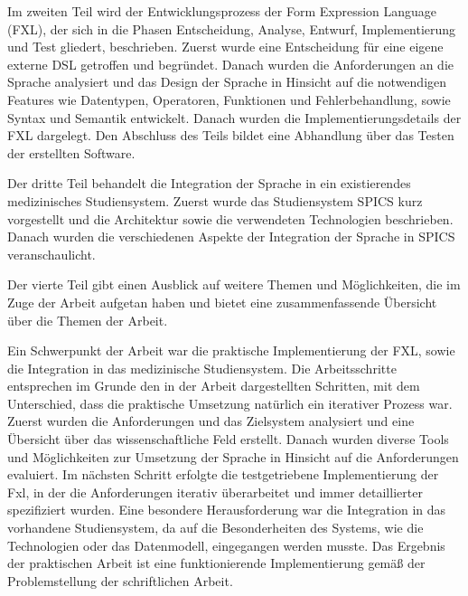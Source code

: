 Im zweiten Teil wird der Entwicklungsprozess der Form Expression Language (FXL), der sich in die Phasen Entscheidung, Analyse, Entwurf, Implementierung und Test gliedert, beschrieben. Zuerst wurde eine Entscheidung für eine eigene externe DSL getroffen und begründet. Danach wurden die Anforderungen an die Sprache analysiert und das Design der Sprache in Hinsicht auf die notwendigen Features wie Datentypen, Operatoren, Funktionen und Fehlerbehandlung, sowie Syntax und Semantik entwickelt. Danach wurden die Implementierungsdetails der FXL dargelegt. Den Abschluss des Teils bildet eine Abhandlung über das Testen der erstellten Software.

Der dritte Teil behandelt die Integration der Sprache in ein existierendes medizinisches Studiensystem. Zuerst wurde das Studiensystem SPICS kurz vorgestellt und die Architektur sowie die verwendeten Technologien beschrieben. Danach wurden die verschiedenen Aspekte der Integration der Sprache in SPICS veranschaulicht.

Der vierte Teil gibt einen Ausblick auf weitere Themen und Möglichkeiten, die im Zuge der Arbeit aufgetan haben und bietet eine zusammenfassende Übersicht über die Themen der Arbeit.

Ein Schwerpunkt der Arbeit war die praktische Implementierung der FXL, sowie die Integration in das medizinische Studiensystem. Die Arbeitsschritte entsprechen im Grunde den in der Arbeit dargestellten Schritten, mit dem Unterschied, dass die praktische Umsetzung natürlich ein iterativer Prozess war. Zuerst wurden die Anforderungen und das Zielsystem analysiert und eine Übersicht über das wissenschaftliche Feld erstellt. Danach wurden diverse Tools und Möglichkeiten zur Umsetzung der Sprache in Hinsicht auf die Anforderungen evaluiert. Im nächsten Schritt erfolgte die testgetriebene Implementierung der Fxl, in der die Anforderungen iterativ überarbeitet und immer detaillierter spezifiziert wurden. Eine besondere Herausforderung war die Integration in das vorhandene Studiensystem, da auf die Besonderheiten des Systems, wie die Technologien oder das Datenmodell, eingegangen werden musste. Das Ergebnis der praktischen Arbeit ist eine funktionierende Implementierung gemäß der Problemstellung der schriftlichen Arbeit.



